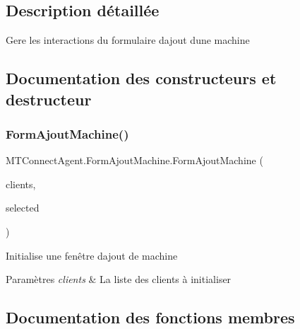\subsection{Description détaillée}
Gere les interactions du formulaire d\textquotesingle{}ajout d\textquotesingle{}une machine 



\subsection{Documentation des constructeurs et destructeur}
\mbox{\label{class_m_t_connect_agent_1_1_form_ajout_machine_acabb6332771d87cf6d8538abd9416de8}} 
\subsubsection{\texorpdfstring{Form\+Ajout\+Machine()}{FormAjoutMachine()}}
{\footnotesize\ttfamily M\+T\+Connect\+Agent.\+Form\+Ajout\+Machine.\+Form\+Ajout\+Machine (\begin{DoxyParamCaption}\item[{List$<$ \mbox{\hyperlink{class_m_t_connect_agent_1_1_model_1_1_client}{Client}} $>$}]{clients,  }\item[{Tree\+Node}]{selected }\end{DoxyParamCaption})\hspace{0.3cm}{\ttfamily [inline]}}



Initialise une fenêtre d\textquotesingle{}ajout de machine 


\begin{DoxyParams}{Paramètres}
{\em clients} & La liste des clients à initialiser\\
\hline
\end{DoxyParams}


\subsection{Documentation des fonctions membres}
\mbox{\label{class_m_t_connect_agent_1_1_form_ajout_machine_a43fb917c218c43331ae32f2e056f9b46}} 
